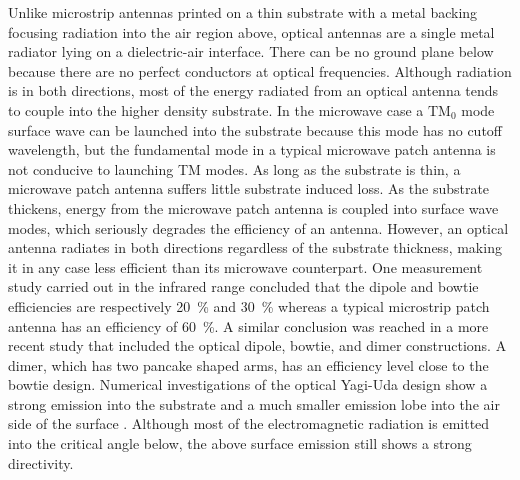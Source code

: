 %
Unlike microstrip antennas printed on a thin substrate with a metal backing focusing radiation into the air region above, optical antennas are a single metal radiator lying on a dielectric-air interface. There can be no ground plane below because there are no perfect conductors at optical frequencies. Although radiation is in both directions, most of the energy radiated from an optical antenna tends to couple into the higher density substrate. In the microwave case a $\text{TM}_0$ mode surface wave can be launched into the substrate because this mode has no cutoff wavelength, but the fundamental mode in a typical microwave patch antenna is not conducive to launching TM modes. As long as the substrate is thin, a microwave patch antenna suffers little substrate induced loss. As the substrate thickens, energy from the microwave patch antenna is coupled into surface wave modes, which seriously degrades the efficiency of an antenna. However, an optical antenna radiates in both directions regardless of the substrate thickness, making it in any case less efficient than its microwave counterpart. One measurement study carried out in
the infrared range \cite{Fischer2008} concluded that the dipole and bowtie efficiencies are respectively \SI{20}{\percent} and \SI{30}{\percent} whereas a typical microstrip patch antenna has an efficiency of \SI{60}{\percent}. A similar conclusion was reached in a more recent study \cite{9781107014145} that included the optical dipole, bowtie, and dimer constructions. A dimer, which has two pancake shaped arms, has an efficiency level close to the bowtie design. Numerical investigations of the optical Yagi-Uda design show a strong emission into the substrate and a much smaller emission lobe into the air side of the surface \cite{Hofmann2007} \cite{Kosako2010}. Although most of the electromagnetic radiation is emitted into the critical angle below, the above surface emission still shows a strong directivity.
